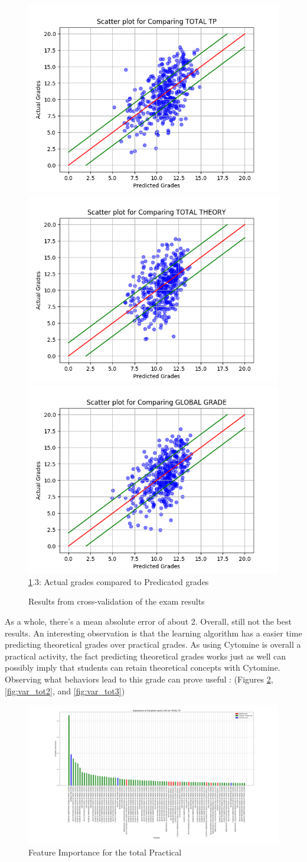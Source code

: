 \documentclass[a4paper,11pt]{report}
\numberwithin{figure}{section} %
\begin{document}
\begin{figure}[H]
      \includegraphics[width=.30\linewidth]{plots/cv_comp_TOTAL_TP_2018-04-27_19_24_46.png}
      \includegraphics[width=.30\linewidth]{plots/cv_comp_TOTAL_THEORY_2018-04-30_13_53_15.png}
  	  \includegraphics[width=.30\linewidth]{plots/cv_comp_GLOBAL_GRADE_2018-04-30_13_48_59.png}
      \\
      \ref{fig:results_tot}.3: Actual grades compared to Predicated grades
      \caption{Results from cross-validation of the exam results}
      \label{fig:results_tot}
    \end{figure}

    As a whole, there's a mean absolute error of about 2.
    Overall, still not the best results.
    An interesting observation is that the learning algorithm has a easier time predicting theoretical grades over practical grades.
    As using Cytomine is overall a practical activity, the fact predicting theoretical grades works just as well can possibly imply that students can retain theoretical concepts with Cytomine.\\

    Observing what behaviors lead to this grade can prove useful : (Figures \ref{fig:var_tot1}, \ref{fig:var_tot2}, and \ref{fig:var_tot3})

      \begin{figure}[H]
      \centering
      \includegraphics[width=.95\linewidth]{plots/var_importance_TOTAL_TP_2018-04-29_14_37_37.png}
      \caption{Feature Importance for the total Practical}
      \label{fig:var_tot1}
      \end{figure}
\end{document}
